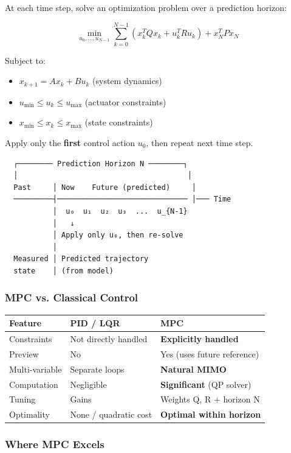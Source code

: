 \documentclass[11pt,a4paper]{book}
\begin{document}
\begin{itemize}
At each time step, solve an optimization problem over a prediction horizon:

\[\min_{u_0, \ldots, u_{N-1}} \sum_{k=0}^{N-1} \left( x_k^T Q x_k + u_k^T R u_k \right) + x_N^T P x_N\]

Subject to:
\begin{itemize}
\item $x_{k+1} = A x_k + B u_k$ (system dynamics)
\item $u_{\min} \leq u_k \leq u_{\max}$ (actuator constraints)
\item $x_{\min} \leq x_k \leq x_{\max}$ (state constraints)
\end{itemize}

Apply only the \textbf{first} control action $u_0$, then repeat next time step.

\begin{lstlisting}
  ┌──────── Prediction Horizon N ────────┐
  │                                       │
  Past     │ Now    Future (predicted)     │
  ─────────┤────────────────────────────── │─── Time
           │  u₀  u₁  u₂  u₃  ...  u_{N-1}
           │   ↓
           │ Apply only u₀, then re-solve
           │
  Measured │ Predicted trajectory
  state    │ (from model)
\end{lstlisting}

\subsubsection{MPC vs. Classical Control}

\begin{center}
\begin{tabular}{|l|l|l|}
\hline
Feature & PID / LQR & MPC \\
\hline
Constraints & Not directly handled & \textbf{Explicitly handled} \\
Preview & No & Yes (uses future reference) \\
Multi-variable & Separate loops & \textbf{Natural MIMO} \\
Computation & Negligible & \textbf{Significant} (QP solver) \\
Tuning & Gains & Weights Q, R + horizon N \\
Optimality & None / quadratic cost & \textbf{Optimal within horizon} \\
\hline
\end{tabular}
\end{center}

\subsubsection{Where MPC Excels}


\end{itemize}
\end{document}
